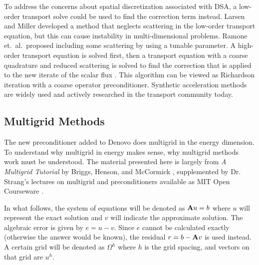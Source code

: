 To address the concerns about spatial discretization associated with DSA, a low-order transport solve could be used to find the correction term instead. Larsen and Miller developed a method that neglects scattering in the low-order transport equation, but this can cause instability in multi-dimensional problems. Ramone et.\ al.\ proposed including some scattering by using a tunable parameter. A high-order transport equation is solved first, then a transport equation with a coarse quadrature and reduced scattering is solved to find the correction that is applied to the new iterate of the scalar flux \cite{Ramone1997}. This algorithm can be viewed as Richardson iteration with a coarse operator preconditioner. Synthetic acceleration methods are widely used and actively researched in the transport community today.

\subsection{Multigrid Methods}
The new preconditioner added to Denovo does multigrid in the energy dimension. To understand why multigrid in energy makes sense, why multigrid methods work must be understood. The material presented here is largely from \emph{A Multigrid Tutorial} by Briggs, Henson, and McCormick \cite{Briggs2000}, supplemented by Dr. Strang's lectures on multigrid and preconditioners available as MIT Open Courseware \cite{Strang}.

In what follows, the system of equations will be denoted as $\mathbf{A}u=b$ where $u$ will represent the exact solution and $v$ will indicate the approximate solution. The algebraic error is given by $e = u - v$. Since $e$ cannot be calculated exactly (otherwise the answer would be known), the residual $r = b - \mathbf{A}v$ is used instead. A certain grid will be denoted as $\Omega^{h}$ where $h$ is the grid spacing, and vectors on that grid are $u^{h}$. 

